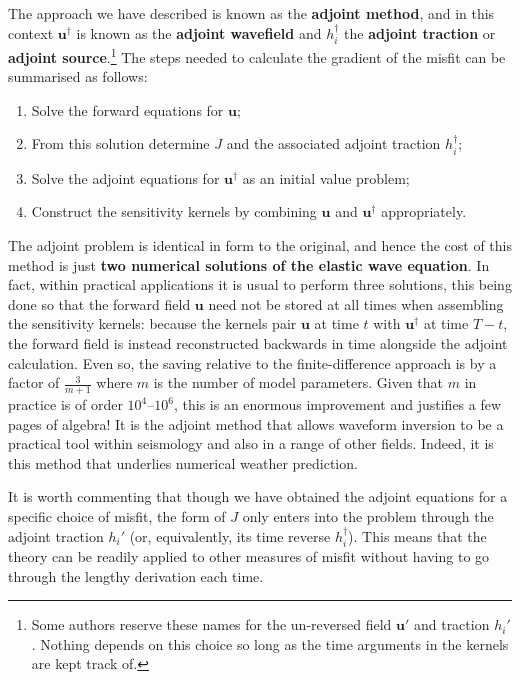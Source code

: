 The approach we have described is known as the \textbf{adjoint method}, and in this context 
$\mathbf{u}^{\dagger}$ is known as the \textbf{adjoint wavefield} and $h_{i}^{\dagger}$ the \textbf{adjoint traction} 
or \textbf{adjoint source}.\footnote{Some authors reserve these names for the un-reversed field $\mathbf{u}'$ and 
traction $h_{i}'$. Nothing depends on this choice so long as the time arguments in the kernels are kept track of.} 
The steps needed to calculate the gradient of the misfit can be summarised as follows:
\begin{enumerate}
    \item Solve the forward equations for $\mathbf{u}$;
    \item From this solution determine $J$ and the associated adjoint traction $h_{i}^{\dagger}$;
    \item Solve the adjoint equations for $\mathbf{u}^{\dagger}$ as an initial value problem;
    \item Construct the sensitivity kernels by combining $\mathbf{u}$ and $\mathbf{u}^{\dagger}$ appropriately.
\end{enumerate}
The adjoint problem is identical in form to the original, and hence the cost of this method is just 
\textbf{two numerical solutions of the elastic wave equation}. In fact, within practical applications it 
is usual to perform three solutions, this being done so that the forward field $\mathbf{u}$ need not be stored at 
all times when assembling the sensitivity kernels: because the kernels pair $\mathbf{u}$ at time $t$ with 
$\mathbf{u}^{\dagger}$ at time $T-t$, the forward field is instead reconstructed backwards in time alongside the 
adjoint calculation. Even so, the saving relative to the finite-difference 
approach is by a factor of $\frac{3}{m+1}$ where $m$ is the number of model parameters. Given that $m$ in practice 
is of order $10^{4}$--$10^{6}$, this is an enormous improvement and justifies a few pages of algebra! 
It is the adjoint method that allows waveform inversion to be a practical tool within seismology and also 
in a range of other fields. Indeed, it is this method that underlies numerical weather prediction.

It is worth commenting that though we have obtained the adjoint equations for a specific choice of misfit, the form of $J$
 only enters into the problem through the adjoint traction $h_{i}'$ (or, equivalently, its time reverse $h_{i}^{\dagger}$). This means that the theory can be readily applied to 
 other measures of misfit without having to go through the lengthy derivation each time.


